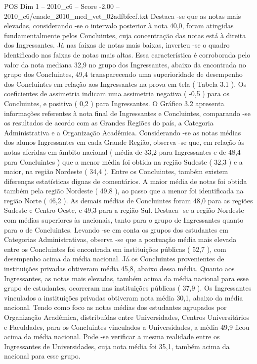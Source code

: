\begin{textsample}{POS Dim 1 – 2010\_c6 – Score -2.00 – 2010\_c6/enade\_2010\_med\_vet\_02adfbfccf.txt}
Destaca -se que as notas mais elevadas, considerando -se o intervalo posterior à nota 40,0, foram atingidas fundamentalmente pelos Concluintes, cuja concentração das notas está à direita dos Ingressantes.
Já nas faixas de notas mais baixas, inverteu -se o quadro identificado nas faixas de notas mais altas.
Essa característica é corroborada pelo valor da nota mediana 32,9 no grupo dos Ingressantes, abaixo da encontrada no grupo dos Concluintes, 49,4 transparecendo uma superioridade de desempenho dos Concluintes em relação aos Ingressantes na prova em tela ( Tabela 3.1 ).
Os coeficientes de assimetria indicam uma assimetria negativa ( -0,5 ) para os Concluintes, e positiva ( 0,2 ) para Ingressantes.
O Gráfico 3.2 apresenta informações referentes à nota final de Ingressantes e Concluintes, comparando -se os resultados de acordo com as Grandes Regiões do país, a Categoria Administrativa e a Organização Acadêmica.
Considerando -se as notas médias dos alunos Ingressantes em cada Grande Região, observa -se que, em relação às notas aferidas em âmbito nacional ( média de 33,2 para Ingressantes e de 48,4 para Concluintes ) que a menor média foi obtida na região Sudeste ( 32,3 ) e a maior, na região Nordeste ( 34,4 ).
Entre os Concluintes, também existem diferenças estatísticas dignas de comentários.
A maior média de notas foi obtida também pela região Nordeste ( 49,8 ), ao passo que a menor foi identificada na região Norte ( 46,2 ).
As demais médias de Concluintes foram 48,0 para as regiões Sudeste e Centro-Oeste, e 49,3 para a região Sul.
Destaca -se a região Nordeste com médias superiores às nacionais, tanto para o grupo de Ingressantes quanto para o de Concluintes.
Levando -se em conta os grupos dos estudantes em Categorias Administrativas, observa -se que a pontuação média mais elevada entre os Concluintes foi encontrada em instituições públicas ( 52,7 ), com desempenho acima da média nacional.
Já os Concluintes provenientes de instituições privadas obtiveram média 45,8, abaixo dessa média.
Quanto aos Ingressantes, as notas mais elevadas, também acima da média nacional para esse grupo de estudantes, ocorreram nas instituições públicas ( 37,9 ).
Os Ingressantes vinculados a instituições privadas obtiveram nota média 30,1, abaixo da média nacional.
Tendo como foco as notas médias dos estudantes agrupados por Organização Acadêmica, distribuídas entre Universidades, Centros Universitários e Faculdades, para os Concluintes vinculados a Universidades, a média 49,9 ficou acima da média nacional.
Pode -se verificar a mesma realidade entre os Ingressantes de Universidades, cuja nota média foi 35,1, também acima da nacional para esse grupo.

\end{textsample}
